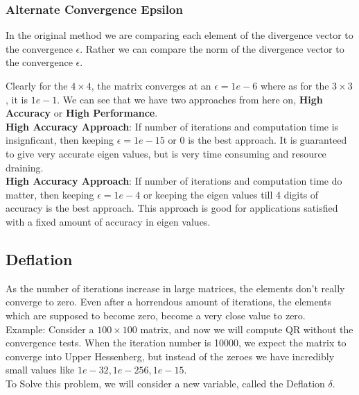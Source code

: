 \documentclass[12pt]{article}
\begin{document}
		\subsubsection{Alternate Convergence Epsilon}
		In the original method we are comparing each element of the divergence vector to the convergence $\epsilon$. Rather we can compare the norm of the divergence vector to the convergence $\epsilon$.

		Clearly for the $4\times 4$, the matrix converges at an $\epsilon = 1e-6$ where as for the $3\times 3$, it is $1e-1$. We can see that we have two approaches from here on, \textbf{High Accuracy} or \textbf{High Performance}.\\
		\textbf{High Accuracy Approach}: If number of iterations and computation time is insignficant, then keeping $\epsilon = 1e-15 \text{ or } 0$ is the best approach. It is guaranteed to give very accurate eigen values, but is very time consuming and resource draining. \\
		\textbf{High Accuracy Approach}: If number of iterations and computation time do matter, then keeping $\epsilon = 1e-4 $ or keeping the eigen values till 4 digits of accuracy is the best approach. This approach is good for applications satisfied with a fixed amount of accuracy in eigen values.
		
		\subsection{Deflation}
		As the number of iterations increase in large matrices, the elements don't really converge to zero. Even after a horrendous amount of iterations, the elements which are supposed to become zero, become a very close value to zero.\\
		Example: Consider a $100 \times 100$ matrix, and now we will compute QR without the convergence tests. When the iteration number is 10000, we expect the matrix to converge into Upper Hessenberg, but instead of the zeroes we have incredibly small values like $1e-32, 1e-256, 1e-15$. \\
		To Solve this problem, we will consider a new variable, called the Deflation $\delta$. 
\end{document}
